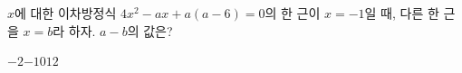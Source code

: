$x$에 대한 이차방정식 $4x^2-ax+a(a-6)=0$의 한 근이 $x=-1$일 때, 다른 한 근을 $x=b$라 하자. $a-b$의 값은? 
\begin{choices32}{$-2$}{$-1$}{$0$}{$1$}{$2$}\end{choices32}
